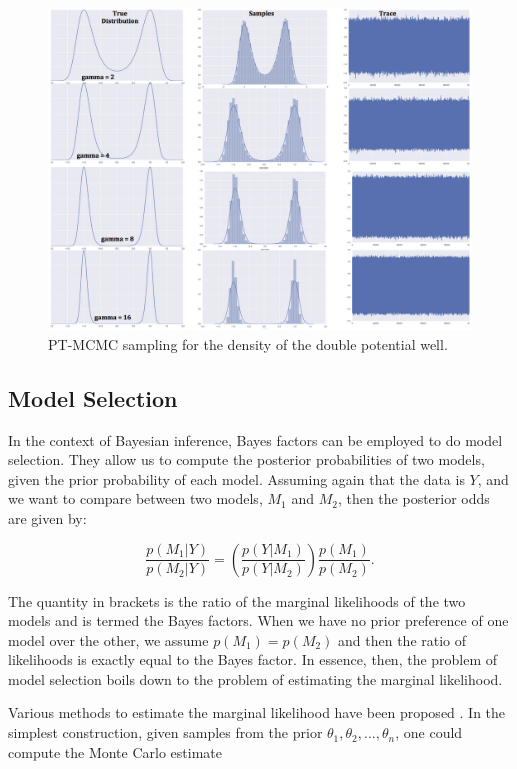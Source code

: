 \begin{figure}[h!]
\centering
\includegraphics[scale=0.55]{tex/embryo/dble_potn_well_ptmcmc.png}
\caption{PT-MCMC sampling for the density of the double potential well.}
\label{fig:pt-mcmc}
\end{figure}

\subsection {Model Selection}

In the context of Bayesian inference, Bayes factors can be employed to do model selection. They allow us to compute the posterior probabilities of two models, given the prior probability of each model. Assuming again that the data is $Y$, and we want to compare between two models, $M_{1}$ and $M_{2}$, then the posterior odds are given by:

$$\frac{p(M_1|Y)}{p(M_2|Y)} = \left (\frac{p(Y|M_{1})}{p(Y|M_{2})}  \right ) \frac{p(M_1)}{p(M_2)}.$$

The quantity in brackets is the ratio of the marginal likelihoods of the two models and is termed the Bayes factors. When we have no prior preference of one model over the other, we assume $p(M_1) = p(M_2)$ and then the ratio of likelihoods is exactly equal to the Bayes factor. In essence, then, the problem of model selection boils down to the problem of estimating the marginal likelihood.

Various methods to estimate the marginal likelihood have been proposed \cite{girolami08a, girolami08b}. In the simplest construction, given samples from the prior $\theta_1 ,\theta_2 , ..., \theta_n $, one could compute the Monte Carlo estimate

